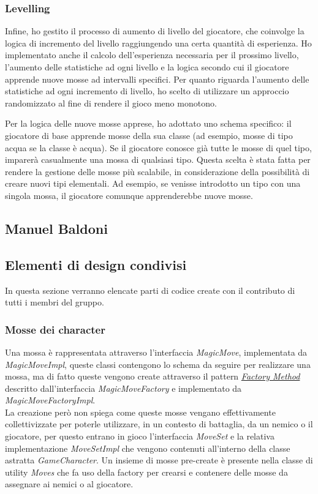 \documentclass[a4paper,12pt]{report}
\begin{document}
\subsubsection{Levelling}
Infine, ho gestito il processo di aumento di livello del giocatore, che coinvolge la logica di incremento del livello raggiungendo una certa quantità di esperienza. Ho implementato anche il calcolo dell'esperienza necessaria per il prossimo livello, l'aumento delle statistiche ad ogni livello e la logica secondo cui il giocatore apprende nuove mosse ad intervalli specifici.
Per quanto riguarda l'aumento delle statistiche ad ogni incremento di livello, ho scelto di utilizzare un approccio randomizzato al fine di rendere il gioco meno monotono.

Per la logica delle nuove mosse apprese, ho adottato uno schema specifico: il giocatore di base apprende mosse della sua classe (ad esempio, mosse di tipo acqua se la classe è acqua). Se il giocatore conosce già tutte le mosse di quel tipo, imparerà casualmente una mossa di qualsiasi tipo. Questa scelta è stata fatta per rendere la gestione delle mosse più scalabile, in considerazione della possibilità di creare nuovi tipi elementali. Ad esempio, se venisse introdotto un tipo con una singola mossa, il giocatore comunque apprenderebbe nuove mosse.

\subsection{Manuel Baldoni}
\subsection{Elementi di design condivisi}
In questa sezione verranno elencate parti di codice create con il contributo di tutti i membri del gruppo.\\
\subsubsection{Mosse dei character}
Una mossa è rappresentata attraverso l'interfaccia \textit{MagicMove}, implementata da \textit{MagicMoveImpl}, queste classi contengono lo schema da seguire per realizzare una mossa, ma di fatto queste vengono create attraverso il pattern \href{https://refactoring.guru/design-patterns/factory-method}{\textit{Factory Method}} descritto dall'interfaccia \textit{MagicMoveFactory} e implementato da \textit{MagicMoveFactoryImpl}. \\ La creazione però non spiega come queste mosse vengano effettivamente collettivizzate per poterle utilizzare, in un contesto di battaglia, da un nemico o il giocatore, per questo entrano in gioco l'interfaccia \textit{MoveSet} e la relativa implementazione \textit{MoveSetImpl} che vengono contenuti all'interno della classe astratta \textit{GameCharacter}. Un insieme di mosse pre-create è presente nella classe di utility \textit{Moves} che fa uso della factory per crearsi e contenere delle mosse da assegnare ai nemici o al giocatore.\\
\end{document}
